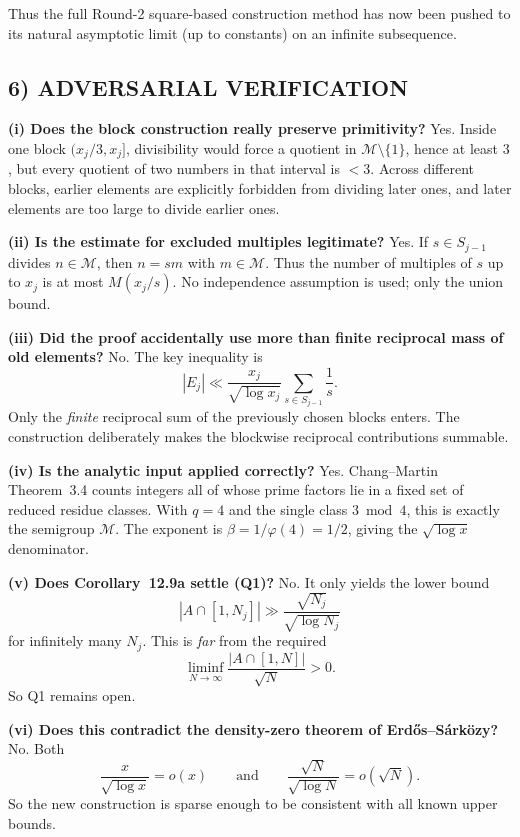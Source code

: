 Thus the full Round-2 square-based construction method has now been pushed to its natural asymptotic limit (up to constants) on an infinite subsequence.

\subsection*{6) ADVERSARIAL VERIFICATION}

\textbf{(i) Does the block construction really preserve primitivity?}
Yes. Inside one block $(x_j/3,x_j]$, divisibility would force a quotient in $\mathcal M\setminus\{1\}$, hence at least $3$, but every quotient of two numbers in that interval is $<3$.
Across different blocks, earlier elements are explicitly forbidden from dividing later ones, and later elements are too large to divide earlier ones.

\textbf{(ii) Is the estimate for excluded multiples legitimate?}
Yes. If $s\in S_{j-1}$ divides $n\in\mathcal M$, then $n=sm$ with $m\in\mathcal M$.
Thus the number of multiples of $s$ up to $x_j$ is at most $M(x_j/s)$.
No independence assumption is used; only the union bound.

\textbf{(iii) Did the proof accidentally use more than finite reciprocal mass of old elements?}
No. The key inequality is
\[
|E_j|\ll \frac{x_j}{\sqrt{\log x_j}}\sum_{s\in S_{j-1}}\frac1s.
\]
Only the \emph{finite} reciprocal sum of the previously chosen blocks enters.
The construction deliberately makes the blockwise reciprocal contributions summable.

\textbf{(iv) Is the analytic input applied correctly?}
Yes. Chang--Martin Theorem~3.4 counts integers all of whose prime factors lie in a fixed set of reduced residue classes.
With $q=4$ and the single class $3\bmod 4$, this is exactly the semigroup $\mathcal M$.
The exponent is $\beta=1/\varphi(4)=1/2$, giving the $\sqrt{\log x}$ denominator.

\textbf{(v) Does Corollary~12.9a settle (Q1)?}
No. It only yields the lower bound
\[
|A\cap[1,N_j]|\gg \frac{\sqrt{N_j}}{\sqrt{\log N_j}}
\]
for infinitely many $N_j$.
This is \emph{far} from the required
\[
\liminf_{N\to\infty}\frac{|A\cap[1,N]|}{\sqrt N}>0.
\]
So Q1 remains open.

\textbf{(vi) Does this contradict the density-zero theorem of Erd\H{o}s--S\'ark\"ozy?}
No. Both
\[
\frac{x}{\sqrt{\log x}}=o(x)
\qquad\text{and}\qquad
\frac{\sqrt N}{\sqrt{\log N}}=o(\sqrt N).
\]
So the new construction is sparse enough to be consistent with all known upper bounds.

